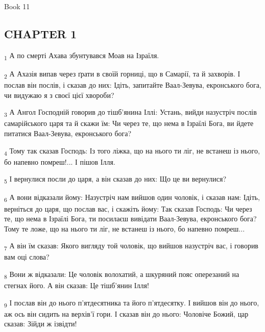 Book 11
\subsection{CHAPTER 1}
\begin{tcolorbox}
\textsubscript{1} А по смерті Ахава збунтувався Моав на Ізраїля.
\end{tcolorbox}
\begin{tcolorbox}
\textsubscript{2} А Ахазія випав через ґрати в своїй горниці, що в Самарії, та й захворів. І послав він послів, і сказав до них: Ідіть, запитайте Ваал-Зевува, екронського бога, чи видужаю я з своєї цієї хвороби?
\end{tcolorbox}
\begin{tcolorbox}
\textsubscript{3} А Ангол Господній говорив до тішб'янина Іллі: Устань, вийди назустріч послів самарійського царя та й скажи їм: Чи через те, що нема в Ізраїлі Бога, ви йдете питатися Ваал-Зевува, екронського бога?
\end{tcolorbox}
\begin{tcolorbox}
\textsubscript{4} Тому так сказав Господь: Із того ліжка, що на нього ти ліг, не встанеш із нього, бо напевно помреш!... І пішов Ілля.
\end{tcolorbox}
\begin{tcolorbox}
\textsubscript{5} І вернулися посли до царя, а він сказав до них: Що це ви вернулися?
\end{tcolorbox}
\begin{tcolorbox}
\textsubscript{6} А вони відказали йому: Назустріч нам вийшов один чоловік, і сказав нам: Ідіть, верніться до царя, що послав вас, і скажіть йому: Так сказав Господь: Чи через те, що нема в Ізраїлі Бога, ти посилаєш вивідати Ваал-Зевува, екронського бога? Тому те ложе, що на нього ти ліг, не встанеш із нього, бо напевно помреш...
\end{tcolorbox}
\begin{tcolorbox}
\textsubscript{7} А він їм сказав: Якого вигляду той чоловік, що вийшов назустріч вас, і говорив вам оці слова?
\end{tcolorbox}
\begin{tcolorbox}
\textsubscript{8} Вони ж відказали: Це чоловік волохатий, а шкуряний пояс оперезаний на стегнах його. А він сказав: Це тішб'янин Ілля!
\end{tcolorbox}
\begin{tcolorbox}
\textsubscript{9} І послав він до нього п'ятдесятника та його п'ятдесятку. І вийшов він до нього, аж ось він сидить на верхів'ї гори. І сказав він до нього: Чоловіче Божий, цар сказав: Зійди ж ізвідти!
\end{tcolorbox}
